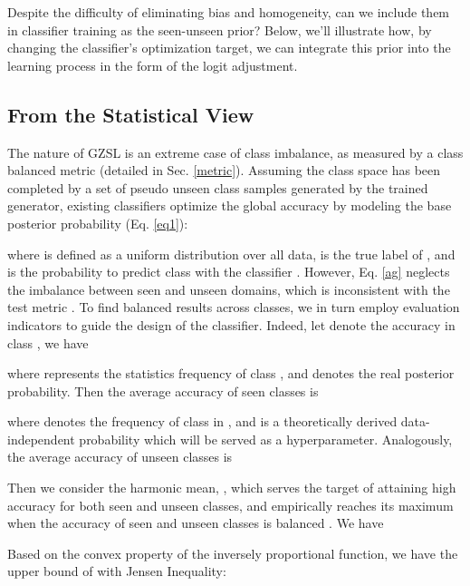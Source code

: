 \documentclass{article}
\begin{document}
	Despite the difficulty of eliminating bias and homogeneity, can we include them in classifier training as the seen-unseen prior? Below, we'll illustrate how, by changing the classifier's optimization target, we can integrate this prior into the learning process in the form of the logit adjustment.
	\subsection{From the Statistical View}
The nature of GZSL is an extreme case of class imbalance, as measured by a class balanced metric  (detailed in Sec. \ref{metric}). Assuming the class space has been completed by a set of pseudo unseen class samples generated by the trained generator, existing classifiers optimize the global accuracy  by modeling the base posterior probability (Eq. \ref{eq1}):
\vspace{-0.3ex}
    
where  is defined as a uniform distribution over all data,  is the true label of , and  is the probability to predict class  with the classifier . However, Eq. \ref{ag} neglects the imbalance between seen and unseen domains, which is inconsistent with the test metric . To find balanced results across classes, we in turn employ evaluation indicators to guide the design of the classifier. Indeed, let  denote the accuracy in class , we have \cite{collell2016reviving}
\vspace{-0.5ex}
	
	where  represents the statistics frequency of class , and  denotes the real posterior probability. Then the average accuracy of seen classes is
    \vspace{-0.2ex}
	
	where  denotes the frequency of class  in , and  is a theoretically derived data-independent probability which will be served as a hyperparameter. Analogously, the average accuracy of unseen classes is
    \vspace{-0.2ex}
	
    
Then we consider the harmonic mean, , which serves the target of attaining high accuracy for both seen and unseen classes, and empirically reaches its maximum when the accuracy of seen and unseen classes is balanced \cite{xian2017zero}. We have
\vspace{-1.7ex}
	
    
	Based on the convex property of the inversely proportional function, we have the upper bound of  with Jensen Inequality:
    \vspace{-0.5ex}
	
\end{document}
